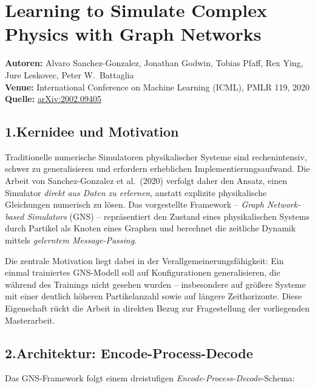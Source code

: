 \documentclass[a4paper,12pt]{article}
\begin{document}
\section*{Learning to Simulate Complex Physics with Graph Networks}

\textbf{Autoren:} Alvaro Sanchez-Gonzalez, Jonathan Godwin, Tobias Pfaff, Rex Ying,
Jure Leskovec, Peter W.\ Battaglia \\
\textbf{Venue:} International Conference on Machine Learning (ICML), PMLR 119, 2020 \\
\textbf{Quelle:} \href{https://arxiv.org/abs/2002.09405}{arXiv:2002.09405}

\subsection*{1.\quad Kernidee und Motivation}

Traditionelle numerische Simulatoren physikalischer Systeme sind rechenintensiv,
schwer zu generalisieren und erfordern erheblichen Implementierungsaufwand. Die Arbeit
von Sanchez-Gonzalez et al.\ (2020) verfolgt daher den Ansatz, einen Simulator
\emph{direkt aus Daten zu erlernen}, anstatt explizite physikalische Gleichungen
numerisch zu lösen. Das vorgestellte Framework -- \emph{Graph Network-based Simulators}
(GNS) -- repräsentiert den Zustand eines physikalischen Systems durch Partikel als
Knoten eines Graphen und berechnet die zeitliche Dynamik mittels \emph{gelerntem
Message-Passing}.

Die zentrale Motivation liegt dabei in der Verallgemeinerungsfähigkeit: Ein einmal
trainiertes GNS-Modell soll auf Konfigurationen generalisieren, die während des
Trainings nicht gesehen wurden -- insbesondere auf größere Systeme mit einer deutlich
höheren Partikelanzahl sowie auf längere Zeithorizonte. Diese Eigenschaft rückt die
Arbeit in direkten Bezug zur Fragestellung der vorliegenden Masterarbeit.

\subsection*{2.\quad Architektur: Encode-Process-Decode}

Das GNS-Framework folgt einem dreistufigen \emph{Encode-Process-Decode}-Schema:
\end{document}
